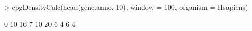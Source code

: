 \begin{Schunk}
\begin{Sinput}
> cpgDensityCalc(head(gene.anno, 10), window = 100, organism = Hsapiens)
\end{Sinput}
\begin{Soutput}
 [1]  0 10 16  7 10 20  6  4  6  4
\end{Soutput}
\end{Schunk}
